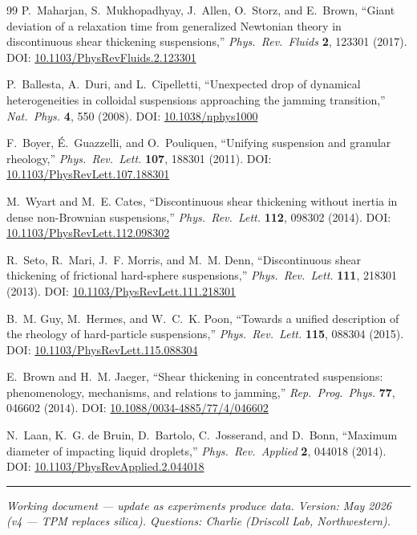 \documentclass[11pt,letterpaper]{article}
\begin{document}
\begin{thebibliography}{99}
  P.~Maharjan, S.~Mukhopadhyay, J.~Allen, O.~Storz, and E.~Brown,
  ``Giant deviation of a relaxation time from generalized Newtonian theory
  in discontinuous shear thickening suspensions,''
  \textit{Phys.\ Rev.\ Fluids} \textbf{2}, 123301 (2017).
  DOI: \href{https://doi.org/10.1103/PhysRevFluids.2.123301}{10.1103/PhysRevFluids.2.123301}

  P.~Ballesta, A.~Duri, and L.~Cipelletti,
  ``Unexpected drop of dynamical heterogeneities in colloidal suspensions
  approaching the jamming transition,''
  \textit{Nat.\ Phys.} \textbf{4}, 550 (2008).
  DOI: \href{https://doi.org/10.1038/nphys1000}{10.1038/nphys1000}

  F.~Boyer, \'{E}.~Guazzelli, and O.~Pouliquen,
  ``Unifying suspension and granular rheology,''
  \textit{Phys.\ Rev.\ Lett.} \textbf{107}, 188301 (2011).
  DOI: \href{https://doi.org/10.1103/PhysRevLett.107.188301}{10.1103/PhysRevLett.107.188301}

  M.~Wyart and M.~E. Cates,
  ``Discontinuous shear thickening without inertia in dense non-Brownian
  suspensions,''
  \textit{Phys.\ Rev.\ Lett.} \textbf{112}, 098302 (2014).
  DOI: \href{https://doi.org/10.1103/PhysRevLett.112.098302}{10.1103/PhysRevLett.112.098302}

  R.~Seto, R.~Mari, J.~F. Morris, and M.~M. Denn,
  ``Discontinuous shear thickening of frictional hard-sphere suspensions,''
  \textit{Phys.\ Rev.\ Lett.} \textbf{111}, 218301 (2013).
  DOI: \href{https://doi.org/10.1103/PhysRevLett.111.218301}{10.1103/PhysRevLett.111.218301}

  B.~M. Guy, M.~Hermes, and W.~C.~K. Poon,
  ``Towards a unified description of the rheology of hard-particle suspensions,''
  \textit{Phys.\ Rev.\ Lett.} \textbf{115}, 088304 (2015).
  DOI: \href{https://doi.org/10.1103/PhysRevLett.115.088304}{10.1103/PhysRevLett.115.088304}

  E.~Brown and H.~M. Jaeger,
  ``Shear thickening in concentrated suspensions: phenomenology, mechanisms,
  and relations to jamming,''
  \textit{Rep.\ Prog.\ Phys.} \textbf{77}, 046602 (2014).
  DOI: \href{https://doi.org/10.1088/0034-4885/77/4/046602}{10.1088/0034-4885/77/4/046602}

  N.~Laan, K.~G. de Bruin, D.~Bartolo, C.~Josserand, and D.~Bonn,
  ``Maximum diameter of impacting liquid droplets,''
  \textit{Phys.\ Rev.\ Applied} \textbf{2}, 044018 (2014).
  DOI: \href{https://doi.org/10.1103/PhysRevApplied.2.044018}{10.1103/PhysRevApplied.2.044018}

\end{thebibliography}

\vspace{20pt}
\noindent\rule{\linewidth}{0.4pt}
{\small\textit{Working document --- update as experiments produce data.
Version: May 2026 (v4 --- TPM replaces silica). Questions: Charlie (Driscoll Lab, Northwestern).}}
\end{document}
